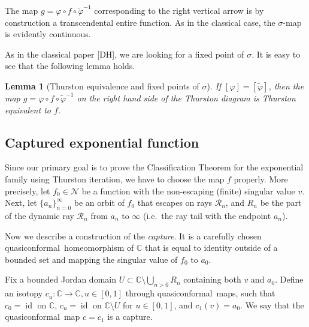 \documentclass[10pt,reqno,a4paper]{amsart}
\numberwithin{figure}{section}
\numberwithin{equation}{section}
\newtheorem{lmm}[thm]{Lemma}
\newcommand{\qc}{quasiconformal}
\newcommand{\id}{\operatorname{id}}
\begin{document}
\begin{center}
\end{center}
The map $g=\varphi\circ f\circ\tilde{\varphi}^{-1}$ corresponding to the right vertical arrow is by construction a transcendental entire function.  As in the classical case, the $\sigma$-map is evidently continuous.

As in the classical paper [DH], we are looking for a fixed point of $\sigma$. It is easy to see that the following lemma holds.

\begin{lmm}[Thurston equivalence and fixed points of $\sigma$]
	If $[\varphi]=[\tilde{\varphi}]$, then the map $g=\varphi\circ f\circ\tilde{\varphi}^{-1}$ on the right hand side of the Thurston diagram is Thurston equivalent to $f$.
\end{lmm} 

\subsection{Captured exponential function}
\label{subsec:capture}

Since our primary goal is to prove the Classification Theorem for the exponential family using Thurston iteration, we have to choose the map $f$ properly. More precisely, let $f_0\in\mathcal{N}$ be a function with the non-escaping (finite) singular value $v$. Next, let $\{a_{n}\}_{n=0}^\infty$ be an orbit of $f_0$ that escapes on rays $\mathcal{R}_{n}$, and $R_{n}$ be the part of the dynamic ray $\mathcal{R}_{n}$ from $a_{n}$ to $\infty$ (i.e.\ the ray tail with the endpoint $a_n$).

Now we describe a construction of the \emph{capture}. It is a carefully chosen \qc\ homeomorphism of $\mathbb{C}$ that is equal to identity outside of a bounded set and mapping the singular value of $f_0$ to $a_0$. 

Fix a bounded Jordan domain $U\subset\mathbb{C}\setminus\bigcup_{n>0} R_{n}$ containing both $v$ and $a_{0}$. Define an isotopy $c_u:\mathbb{C}\to\mathbb{C}, u\in[0,1]$ through \qc\ maps, such that $c_0=\id$ on $\mathbb{C}$, $c_u=\id$ on $\mathbb{C}\setminus U$ for $u\in[0,1]$, and $c_1(v)=a_{0}$. We say that the \qc\ map $c=c_1$ is a capture. 
\end{document}
